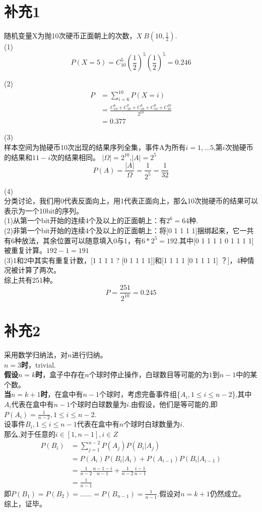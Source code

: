 \documentclass[a4paper,twocolumn]{ctexart}
\begin{document}
\section*{补充1}
\noindent 随机变量X为抛10次硬币正面朝上的次数，$X~B(10,\frac{1}{2})$.\\
\noindent(1)\\
\[
P(X=5)=C_{10}^5 (\frac{1}{2})^{5}(\frac{1}{2})^{5}=0.246
\]

\noindent(2)\\
\begin{align*}
P&=\sum_{i=6}^{10}P(X=i)\\
&=\frac{C_{10}^6+C_{10}^7+C_{10}^8+C_{10}^9+C_{10}^{10}}{2^{10}}\\
&=0.377
\end{align*}

\noindent(3)\\
样本空间为抛硬币10次出现的结果序列全集，事件A为所有$i=1,...5$,第$i$次抛硬币的结果和$11-i$次的结果相同。
$|\Omega|=2^{10}$,$|A|=2^5$
\[
P(A)=\frac{|A|}{\Omega}=\frac{1}{2^5}=\frac{1}{32}
\]

\noindent(4)\\
分类讨论，我们用0代表反面向上，用1代表正面向上，那么10次抛硬币的结果可以表示为一个10bit的序列。\\
(1)从第一个bit开始的连续4个及以上的正面朝上：有$2^6=64$种.\\
(2)非第一个bit开始的连续4个及以上的正面朝上：将[0 1 1 1 1]捆绑起来，它一共有6种放法，其余位置可以随意填入0与1，有$6*2^5=192$.其中[0 1 1 1 1 0 1 1 1 1]被重复计算。$192-1=191$\\
(3)1和2中其实有重复计数，[1 1 1 1 ? [0 1 1 1 1]]和[1 1 1 1 [0 1 1 1 1] ？]，4种情况被计算了两次。\\
综上共有251种。\\
\[P=\frac{251}{2^{10}}=0.245\]
\section*{补充2}
采用数学归纳法，对$n$进行归纳。\\
\indent \textbf{$n=3$时}，trivial.\\
\indent \textbf{假设$n=k$时}，盒子中存在$n$个球时停止操作，白球数目等可能的为$1$到$n-1$中的某个数。\\
\indent \textbf{当$n=k+1$时}，在盒中有$n-1$个球时，考虑完备事件组\{$A_i,1\le i \le n-2$\},其中$A_i$代表在盒中有$n-1$个球时白球数量为$i$.由假设，他们是等可能的,即$P(A_i)=\frac{1}{n-2},1\le i \le n-2$.\\
\indent 设事件$B_i,1\le i \le n-1$代表在盒中有$n$个球时白球数量为$i$.\\
那么,对于任意的$i\in [1,n-1],i \in Z$
\begin{align*}
P(B_i)&=\sum_{j=1}^{n-2}P(A_j)P(B_i|A_j)\\
&=P(A_i)P(B_i|A_i)+P(A_{i-1})P(B_i|A_{i-1})\\
&=\frac{1}{n-2}\frac{n-1-i}{n-1}+\frac{1}{n-2}\frac{i-1}{n-1}\\
&=\frac{1}{n-1}
\end{align*}
即$P(B_1)=P(B_2)=......=P(B_{n-1})=\frac{1}{n-1}$.假设对$n=k+1$仍然成立。\\
\indent 综上，证毕。
\end{document}

